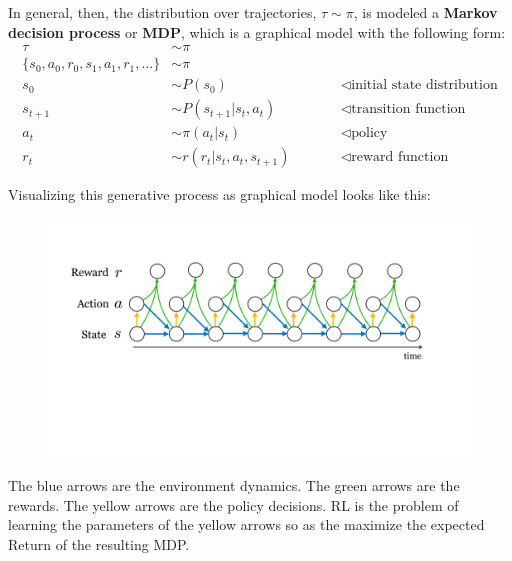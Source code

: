 In general, then, the distribution over trajectories, $\tau \sim \pi$, is modeled a {\bf Markov decision process} or {\bf MDP}, which is a graphical model with the following form:
\begin{align}
    \tau &\sim \pi\\
    \{s_0, a_0, r_0, s_1, a_1, r_1, \ldots\} &\sim \pi\\
    s_0 &\sim P(s_0) \quad\quad &&\triangleleft \text{initial state distribution}\\
    s_{t+1} &\sim P(s_{t+1} | s_t, a_t) \quad\quad &&\triangleleft \text{transition function}\\
    a_t &\sim \pi(a_t | s_t) \quad\quad &&\triangleleft \text{policy}\\
    r_t &\sim r(r_t | s_t, a_t, s_{t+1}) \quad\quad &&\triangleleft \text{reward function}
\end{align}

Visualizing this generative process as graphical model looks like this:
\begin{figure}[h]
    \centering
    \includegraphics[width=0.8\linewidth]{./figures/intelligent_agents/MDP.pdf}
    \label{fig:intelligent_agents:MDP}
\end{figure}

The blue arrows are the environment dynamics. The green arrows are the rewards. The yellow arrows are the policy decisions. RL is the problem of learning the parameters of the yellow arrows so as the maximize the expected Return of the resulting MDP.




